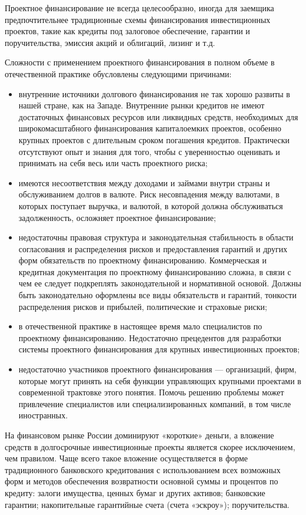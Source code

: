 Проектное финансирование не всегда целесообразно, иногда для заемщика предпочтительнее традиционные схемы финансирования инвестиционных проектов, такие как кредиты под залоговое обеспечение, гарантии и поручительства, эмиссия акций и облигаций, лизинг и т.д.

Сложности с применением проектного финансирования в полном объеме в отечественной практике обусловлены следующими причинами:
\begin{itemize}
	\item внутренние источники долгового финансирования не так хорошо развиты в нашей стране, как на Западе. Внутренние рынки кредитов не имеют достаточных финансовых ресурсов или ликвидных средств, необходимых для широкомасштабного финансирования капиталоемких проектов, особенно крупных проектов с длительным сроком погашения кредитов. Практически отсутствуют опыт и знания для того, чтобы с уверенностью оценивать и принимать на себя весь или часть проектного риска;
	\item имеются несоответствия между доходами и займами внутри страны и обслуживанием долгов в валюте. Риск несовпадения между валютами, в которых поступает выручка, и валютой, в которой должна обслуживаться задолженность, осложняет проектное финансирование;
	\item недостаточны правовая структура и законодательная стабильность в области согласования и распределения рисков и предоставления гарантий и других форм обязательств по проектному финансированию. Коммерческая и кредитная документация по проектному финансированию сложна, в связи с чем ее следует подкреплять законодательной и нормативной основой. Должны быть законодательно оформлены все виды обязательств и гарантий, тонкости распределения рисков и прибылей, политические и страховые риски;
	\item в отечественной практике в настоящее время мало специалистов по проектному финансированию. Недостаточно прецедентов для разработки системы проектного финансирования для крупных инвестиционных проектов;
	\item недостаточно участников проектного финансирования --- организаций, фирм, которые могут принять на себя функции управляющих крупными проектами в современной трактовке этого понятия. Помочь решению проблемы может привлечение специалистов или специализированных компаний, в том числе иностранных.
\end{itemize}

На финансовом рынке России доминируют «короткие» деньги, а вложение средств в долгосрочные инвестиционные проекты является скорее исключением, чем правилом.
Чаще всего такое вложение осуществляется в форме традиционного банковского кредитования с использованием всех возможных форм и методов обеспечения возвратности основной суммы и процентов по кредиту: залоги имущества, ценных бумаг и других активов; банковские гарантии; накопительные гарантийные счета (счета «эскроу»); поручительства.

